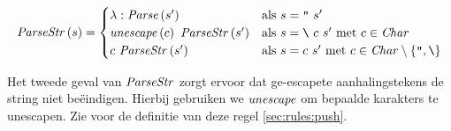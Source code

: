$$
	\mathit{ParseStr}\left(s\right) =
		\begin{cases}
			\lambda:\mathit{Parse}\left(s'\right) & \text{als $s=\texttt{"}~s'$} \\
			\mathit{unescape}\left(c\right)~\mathit{ParseStr}\left(s'\right) & \text{als $s=\texttt{\textbackslash}~c~s'$
				met $c \in\mathit{Char}$} \\
			c~\mathit{ParseStr}\left(s'\right) & \text{als $s=c~s'$ met $c
				\in\mathit{Char}\setminus\{\texttt{"},\texttt{\textbackslash}\}$}\\
		\end{cases}
$$

Het tweede geval van $\mathit{ParseStr}$ zorgt ervoor dat ge-escapete
aanhalingstekens de string niet beëindigen. Hierbij gebruiken we $\mathit{unescape}$
om bepaalde karakters te unescapen. Zie voor de definitie van deze regel
\autoref{sec:rules:push}.

